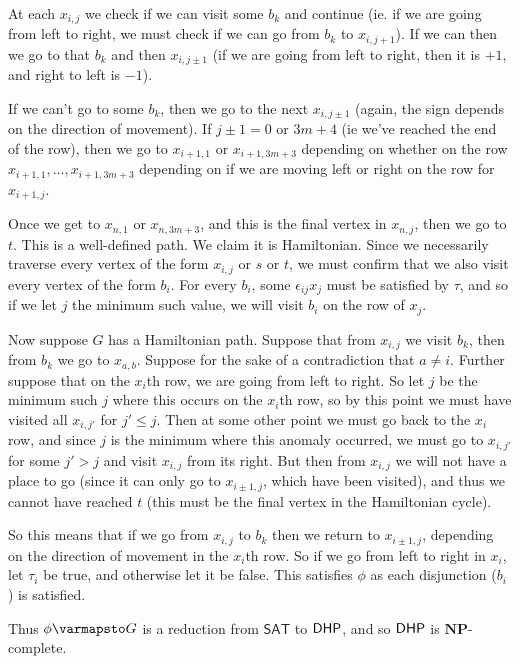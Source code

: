 \documentclass[10pt]{article}
\def\sat{\mathsf{SAT}}
\def\NP{\mathbf{NP}}
\begin{document}
\begin{exam*}
        At each $x_{i,j}$ we check if we can visit some $b_k$ and continue (ie. if we are going from left to right, we must check if we can go from $b_k$ to $x_{i,j+1}$).
        If we can then we go to that $b_k$ and then $x_{i,j\pm1}$ (if we are going from left to right, then it is $+1$, and right to left is $-1$).

        If we can't go to some $b_k$, then we go to the next $x_{i,j\pm1}$ (again, the sign depends on the direction of movement).
        If $j\pm1=0$ or $3m+4$ (ie we've reached the end of the row), then we go to $x_{i+1,1}$ or $x_{i+1,3m+3}$ depending on whether on the row $x_{i+1,1},\dots,x_{i+1,3m+3}$ depending on if we are moving
        left or right on the row for $x_{i+1,j}$.
        \item Once we get to $x_{n,1}$ or $x_{n,3m+3}$, and this is the final vertex in $x_{n,j}$, then we go to $t$.
    \eenum
    This is a well-defined path.
    We claim it is Hamiltonian.
    Since we necessarily traverse every vertex of the form $x_{i,j}$ or $s$ or $t$, we must confirm that we also visit every vertex of the form $b_i$.
    For every $b_i$, some $\epsilon_{ij}x_j$ must be satisfied by $\tau$, and so if we let $j$ the minimum such value, we will visit $b_i$ on the row of $x_j$.

    Now suppose $G$ has a Hamiltonian path.
    Suppose that from $x_{i,j}$ we visit $b_k$, then from $b_k$ we go to $x_{a,b}$.
    Suppose for the sake of a contradiction that $a\neq i$.
    Further suppose that on the $x_i$th row, we are going from left to right.
    So let $j$ be the minimum such $j$ where this occurs on the $x_i$th row, so by this point we must have visited all $x_{i,j'}$ for $j'\leq j$.
    Then at some other point we must go back to the $x_i$ row, and since $j$ is the minimum where this anomaly occurred, we must go to $x_{i,j'}$ for some $j'>j$ and visit $x_{i,j}$ from its right.
    But then from $x_{i,j}$ we will not have a place to go (since it can only go to $x_{i\pm1,j}$, which have been visited), and thus we cannot have reached $t$ (this must be the final vertex in the
    Hamiltonian cycle).

    So this means that if we go from $x_{i,j}$ to $b_k$ then we return to $x_{i\pm1,j}$, depending on the direction of movement in the $x_i$th row.
    So if we go from left to right in $x_i$, let $\tau_i$ be true, and otherwise let it be false.
    This satisfies $\phi$ as each disjunction ($b_i$) is satisfied.

    Thus $\phi\varmapsto G$ is a reduction from $\sat$ to $\mathsf{DHP}$, and so $\mathsf{DHP}$ is $\NP$-complete.

\end{exam*}
\end{document}
